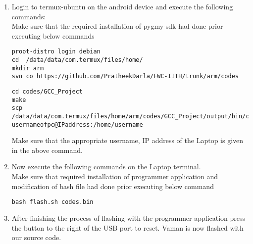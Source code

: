 \documentclass[journal,12pt,twocolumn]{IEEEtran}
\begin{document}
\vspace{5mm}    

\begin{enumerate}
\item Login to termux-ubuntu on the android device and execute the following commands:\\
Make sure that the required installation of pygmy-sdk had done prior executing below commands
\begin{lstlisting}
proot-distro login debian
cd  /data/data/com.termux/files/home/
mkdir arm
svn co https://github.com/PratheekDarla/FWC-IITH/trunk/arm/codes
\end{lstlisting}
\begin{lstlisting}
cd codes/GCC_Project
make
scp /data/data/com.termux/files/home/arm/codes/GCC_Project/output/bin/codes.bin usernameofpc@IPaddress:/home/username
\end{lstlisting}
Make sure that the appropriate username, IP address of the Laptop is given in the above command.
\item Now execute the following commands on the Laptop terminal.\\
Make sure that required installation of programmer application and modification of bash file had done prior executing below command
\begin{lstlisting}
bash flash.sh codes.bin
\end{lstlisting}
\item After finishing the process of flashing with the programmer application press the button to the right of the USB port to reset. Vaman is now flashed with our source code.
\end{enumerate}
\end{document}
